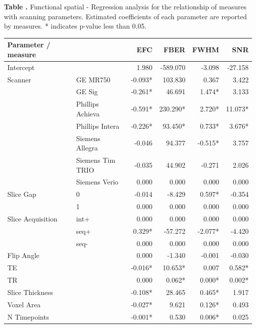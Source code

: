 \begin{table}
  \textbf{\label{func_spat_reg} Table .}{ Functional spatial - Regression analysis for the relationship of measures with scanning parameters. Estimated coefficients of each parameter are reported by measures. * indicates p-value less than 0.05.  }
  \begin{center}

    \begin{tabular}{ l l r r r r }
    \hline
    Parameter / measure & & EFC & FBER & FWHM & SNR \\ \hline
    Intercept & & 1.980 & -589.070 & -3.098 & -27.158 \\
    Scanner & GE MR750 & -0.093* & 103.830 & 0.367 & 3.422 \\
     & GE Sig & -0.261* & 46.691 & 1.474* & 3.133 \\
     & Phillips Achieva & -0.591* & 230.290* & 2.720* & 11.073* \\
     & Phillips Intera & -0.226* & 93.450* & 0.733* & 3.676* \\
     & Siemens Allegra & -0.046 & 94.377 & -0.515* & 3.757 \\
     & Siemens Tim TRIO & -0.035 & 44.902 & -0.271 & 2.026 \\
     & Siemens Verio & 0.000 & 0.000 & 0.000 & 0.000 \\
    Slice Gap & 0 & -0.014 & -8.429 & 0.597* & -0.354 \\
     & 1 & 0.000 & 0.000 & 0.000 & 0.000 \\
    Slice Acquisition & int+ & 0.000 & 0.000 & 0.000 & 0.000 \\
     & seq+ & 0.329* & -57.272 & -2.077* & -4.420 \\
     & seq- & 0.000 & 0.000 & 0.000 & 0.000 \\
    Flip Angle & & 0.000 & -1.340 & -0.001 & -0.030 \\
    TE & & -0.016* & 10.653* & 0.007 & 0.582* \\
    TR & & 0.000 & 0.062* & 0.000* & 0.002* \\
    Slice Thickness & & -0.108* & 28.465 & 0.465* & 1.917 \\
    Voxel Area & & -0.027* & 9.621 & 0.126* & 0.493 \\
    N Timepoints & & -0.001* & 0.530 & 0.006* & 0.025 \\
    \hline
    \end{tabular}
  \end{center}
\end{table}

